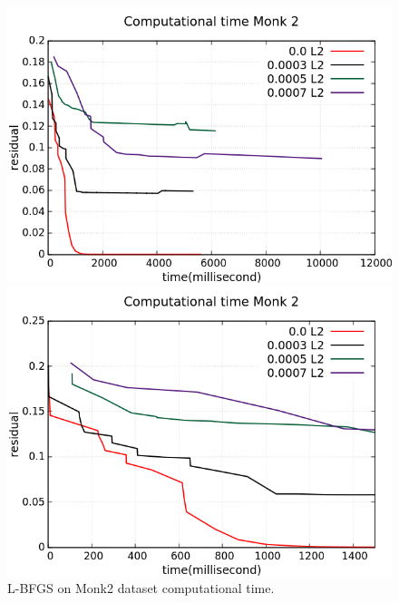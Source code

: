 \begin{figure}[H]
	\centering
	\begin{minipage}[t]{0.5\linewidth}
		\includegraphics[width=\linewidth]{data/LBFGS/Monk2/Monk2_LBFGS_CT_standard.png}
	\end{minipage}%
	\begin{minipage}[t]{0.5\linewidth}
		\includegraphics[width=\linewidth]{data/LBFGS/Monk2/Monk2_LBFGS_CT_zoom.png}
	\end{minipage}
	\caption{L-BFGS on Monk2 dataset computational time.}
\end{figure}
